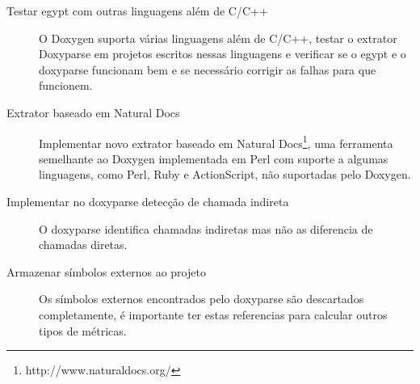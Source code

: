 \begin{description}

\item[Testar egypt com outras linguagens além de C/C++]
O Doxygen suporta várias linguagens além de C/C++, testar o extrator Doxyparse
em projetos escritos nessas linguagens e verificar se o egypt e o doxyparse
funcionam bem e se necessário corrigir as falhas para que funcionem.

\item[Extrator baseado em Natural Docs]
Implementar novo extrator baseado em Natural
Docs\footnote{http://www.naturaldocs.org/}, uma ferramenta semelhante ao
Doxygen implementada em Perl com suporte a algumas linguagens, como Perl, Ruby
e ActionScript, não suportadas pelo Doxygen.

\item[Implementar no doxyparse detecção de chamada indireta]
O doxyparse identifica chamadas indiretas mas não as diferencia de chamadas
diretas.

\item[Armazenar símbolos externos ao projeto]
Os símbolos externos encontrados pelo doxyparse são descartados completamente,
é importante ter estas referencias para calcular outros tipos de métricas.

\end{description}

